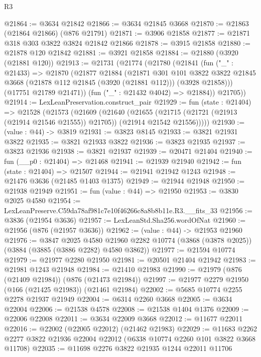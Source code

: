 \begin{lexlean}{R3}
\begin{coremodule}
@21864 := @3634 @21842
@21866 := @3634 @21845 @3668
@21870 := @21863 (@21864 @21866) (@876 @21791)
@21871 := @3906 @21858
@21877 := @21871 @318 @303 @3822 @3824 @21842 @21866
@21878 := @3915 @21858
@21880 := @21878 @120 @21842
@21881 := @3921 @21858
@21884 := @21880 (@3920 (@21881 @120))
@21913 := @21731
    (@21774
      (@21780
        (@21841
          (fun ("_" : @21433) =>
          @21870
            (@21877
              @21884
              (@21871
                @301
                @101
                @3822
                @3822
                @21845
                @3668
                (@21878 @112 @21845 (@3920 (@21881 @112)))
                (@3928 @21858)))
            (@17751 @21789 @21471))
          (fun ("_" : @21432 @4042) => @21884))
        @21705))
@21914 := LexLeanPreservation.construct_pair
@21929 := fun (state : @21404) =>
  @21528
    (@21573
      (@21609
        (@21640
          (@21655
            (@21715 (@21721 (@21913 (@21914 @21546 @21555)) @21705))
            (@21914 @21542 @21556)))))
@21930 := (value : @44) -> @3819
@21931 := @3823 @8145
@21933 := @3821 @21931 @3822
@21935 := @3821 @21933 @3822
@21936 := @3823 @21935
@21937 := @3823 @21936
@21938 := @3821 @21937
@21939 := @20471 @21404
@21940 := fun (__p0 : @21404) => @21468
@21941 := @21939 @21940
@21942 := fun (state : @21404) => @21507
@21944 := @21941 @21942 @1243
@21948 := @21476 @3636 (@21485 @1403 @1375)
@21949 := @21944 @21948
@21950 := @21938 @21949
@21951 := fun (value : @44) => @21950
@21953 := @3830 @2025 @4580
@21954 := LexLeanPreserve.C59da78af981c7e10f46266c8a8b8b11e.R3.__fits_33
@21956 := @3836 (@21954 @3636)
@21957 := LexLeanStd.Sha256.wordOfNat
@21960 := @21956 (@876 (@21957 @3636))
@21962 := (value : @44) -> @21953 @21960
@21976 := @3847
    @2025
    @4580
    @21960
    @2282
    @10774
    (@3868 (@3878 @2025))
    (@3884 (@3885 (@3886 @2282) @4580 @3862))
@21977 := @21594 @10774
@21979 := @21977 @2280 @21950
@21981 := @20501 @21404 @21942
@21983 := @21981 @1243 @21948
@21984 := @21410 @21983
@21990 := @21979 (@876 (@21409 @21984)) (@876 (@21473 @21984))
@21997 := @21977 @2279 @21950 (@166 (@21425 @21983)) (@21461 @21984)
@22002 := @5685 @10774 @2255 @2278 @21937 @21949
@22004 := @6314 @2260 @3668
@22005 := @3634 @22004
@22006 := @21538 @4578
@22008 := @21538 @1404 @1376
@22009 := @22006 @22008
@22011 := @3634 @22009 @3668
@22012 := @11677 @22011
@22016 := @22002 (@22005 @22012) (@21462 @21983)
@22029 := @11683 @2262 @2277 @3822 @21936 @22004 @22012 (@6338 @10774 @2260 @101 @3822 @3668 @11708)
@22035 := @11698 @2276 @3822 @21935 @1244 @22011 @11706

\end{coremodule}
\end{lexlean}

